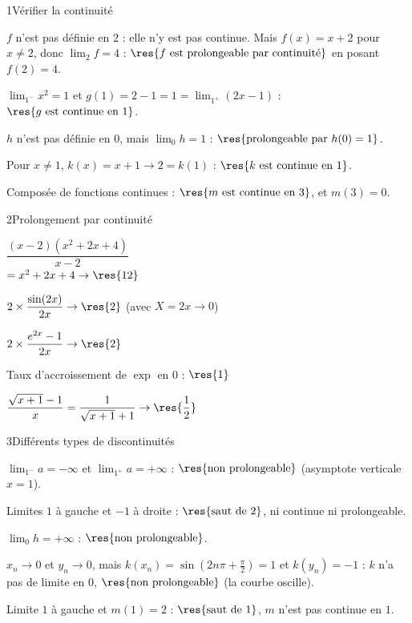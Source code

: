 

\begin{deuxcolonnes}

\begin{corrige}{1}{Vérifier la continuité}
\begin{questions}
  \item $f$ n'est pas définie en $2$ : elle n'y est pas continue. Mais $f(x)=x+2$ pour $x\neq2$, donc
    $\lim_{2}f=4$ : $\res{f\text{ est prolongeable par continuité}}$ en posant $f(2)=4$.
  \item $\lim_{1^{-}}x^{2}=1$ et $g(1)=2-1=1=\lim_{1^{+}}(2x-1)$ : $\res{g\text{ est continue en }1}$.
  \item $h$ n'est pas définie en $0$, mais $\lim_{0}h=1$ : $\res{\text{prolongeable par }h(0)=1}$.
  \item Pour $x\neq1$, $k(x)=x+1\to2=k(1)$ : $\res{k\text{ est continue en }1}$.
  \item Composée de fonctions continues : $\res{m\text{ est continue en }3}$, et $m(3)=0$.
\end{questions}
\end{corrige}

\begin{corrige}{2}{Prolongement par continuité}
\begin{questions}
  \item $\dfrac{(x-2)\left(x^{2}+2x+4\right)}{x-2}$\\ $=x^{2}+2x+4\to\res{12}$
  \item $2\times\dfrac{\sin(2x)}{2x}\to\res{2}$ (avec $X=2x\to0$)
  \item $2\times\dfrac{e^{2x}-1}{2x}\to\res{2}$
  \item Taux d'accroissement de $\exp$ en $0$ : $\res{1}$
  \item $\dfrac{\sqrt{x+1}-1}{x}=\dfrac{1}{\sqrt{x+1}+1}\to\res{\dfrac12}$
\end{questions}
\end{corrige}

\begin{corrige}{3}{Différents types de discontinuités}
\begin{questions}
  \item $\lim_{1^{-}}a=-\infty$ et $\lim_{1^{+}}a=+\infty$ : $\res{\text{non prolongeable}}$ (asymptote verticale $x=1$).
  \item Limites $1$ à gauche et $-1$ à droite : $\res{\text{saut de }2}$, ni continue ni prolongeable.
  \item $\lim_{0}h=+\infty$ : $\res{\text{non prolongeable}}$.
  \item $x_n\to0$ et $y_n\to0$, mais $k(x_n)=\sin\left(2n\pi+\frac\pi2\right)=1$ et $k(y_n)=-1$ : $k$ n'a pas de limite en $0$,
    $\res{\text{non prolongeable}}$ (la courbe oscille).
  \item Limite $1$ à gauche et $m(1)=2$ : $\res{\text{saut de }1}$, $m$ n'est pas continue en $1$.
\end{questions}
\end{corrige}


\end{deuxcolonnes}
